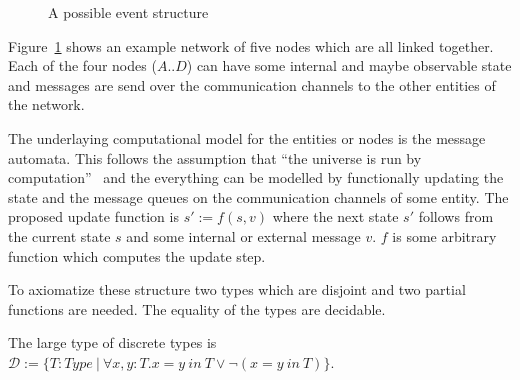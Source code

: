 \begin{figure}[ht]
  \centering
  \caption{A possible event structure}
  \label{fig:structure}
\end{figure}

Figure~\ref{fig:structure} shows an example network of five nodes which
are all linked together. Each of the four nodes ($A..D$) can have some internal
and maybe observable state and messages are send over the communication channels
to the other entities of the network. 

The underlaying computational model for the entities or nodes is the
message automata. This follows the assumption that ``the universe is run by
computation''~\cite{bickford2005causal} and the everything can be modelled
by functionally updating the state and the message queues on the communication
channels of some entity. The proposed update function is $s':=f(s,v)$ where
the next state $s'$ follows from the current state $s$ and some internal or
external message $v$. $f$ is some arbitrary function which computes
the update step.~\cite{bickford2005causal}

To axiomatize these structure two types which are disjoint and two partial
functions are needed. The equality of the types are decidable.

\begin{defi}
  The large type of discrete types is
  $\mathcal{D}:=\{T:Type\ |\ \forall x,y:T.x=y\ in\ T\vee\neg (x=y\ in\ T)\}$.
  \textnormal{~\cite{bickford2005causal}}
\end{defi}

